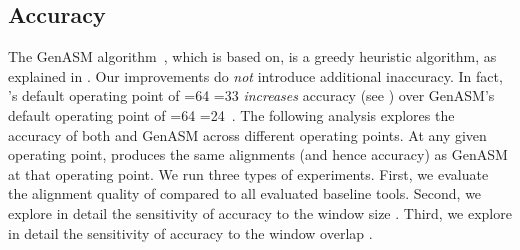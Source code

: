 \begin{table}[h]
\caption{Estimated area and power of a \toolname ASIC with  .}
\label{table:asic_numbers}
\end{table}

\subsection{Accuracy} \label{sec:accuracy}
The GenASM algorithm~\citep{cali2020genasm}, which \toolname is based on, is a greedy heuristic algorithm, as explained in . Our improvements do \emph{not} introduce additional inaccuracy. In fact, \toolname's default operating point of =64 =33 \emph{increases} accuracy (see ) over GenASM's default operating point of =64 =24~\citep{cali2020genasm}. The following analysis explores the accuracy of both \toolname and GenASM across different operating points. At any given operating point, \toolname produces the same alignments (and hence accuracy) as GenASM at that operating point. We run three types of experiments. First, we evaluate the alignment quality of \toolname compared to all evaluated baseline tools. Second, we explore in detail the sensitivity of accuracy to the window size . Third, we explore in detail the sensitivity of accuracy to the window overlap .

